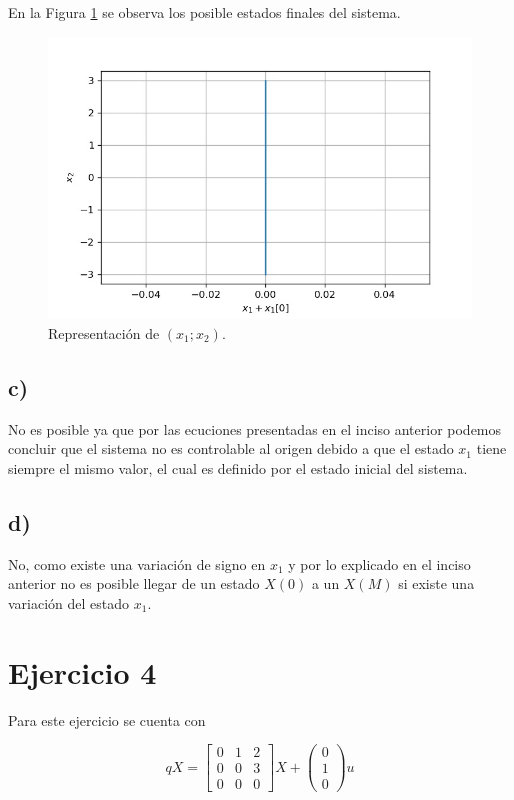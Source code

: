 \documentclass[11pt,a4paper]{article}
\begin{document}
        En la Figura \ref{fig:3-b} se observa los posible estados finales del sistema.

        \begin{figure}
            \centering 
            \includegraphics[width=.5\textwidth]{Img/3-b.jpg}
            \caption{Representación de $(x_1;x_2)$.}
            \label{fig:3-b}
        \end{figure} 

    \subsection*{c)}

    No es posible ya que por las ecuciones presentadas en el inciso anterior podemos concluir que 
    el sistema no es controlable al origen debido a que el estado $x_1$ tiene siempre el mismo valor,
    el cual es definido por el estado inicial del sistema.

    \subsection*{d)}

    No, como existe una variación de signo en $x_1$ y por lo explicado en el inciso anterior no 
    es posible llegar de un estado $X(0)$ a un $X(M)$ si existe una variación del estado 
    $x_1$.

    \section*{Ejercicio 4}

    Para este ejercicio se cuenta con 

    \begin{equation}
        qX = 
        \begin{bmatrix}
            0 & 1 & 2 \\ 
            0 & 0 & 3 \\ 
            0 & 0 & 0 
        \end{bmatrix} X 
        + 
        \begin{pmatrix}
            0 \\ 1 \\ 0
        \end{pmatrix} u
    \end{equation}
\end{document}
